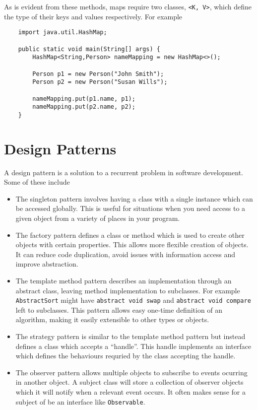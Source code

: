 \documentclass[12pt]{report}
\newcommand{\code}[1]{\lstinline{#1}}
\begin{document}
\begin{flushleft}
As is evident from these methods, maps require two classes, \code{<K, V>},
which define the type of their keys and values respectively. For example

\begin{lstlisting}
    import java.util.HashMap;

    public static void main(String[] args) {
        HashMap<String,Person> nameMapping = new HashMap<>();

        Person p1 = new Person("John Smith");
        Person p2 = new Person("Susan Wills");

        nameMapping.put(p1.name, p1);
        nameMapping.put(p2.name, p2);
    }
\end{lstlisting}

\section*{Design Patterns}

A design pattern is a solution to a recurrent problem in software development.
Some of these include

\begin{itemize}
    \item The singleton pattern involves having a class with a single instance
        which can be accessed globally. This is useful for situations when you
        need access to a given object from a variety of places in your program.
    \item The factory pattern defines a class or method which is used to create
        other objects with certain properties. This allows more flexible
        creation of objects. It can reduce code duplication, avoid issues with
        information access and improve abstraction.
    \item The template method pattern describes an implementation through an
        abstract class, leaving method implementation to subclasses. For
        example \code{AbstractSort} might have \code{abstract void swap} and
        \code{abstract void compare} left to subclasses. This pattern allows
        easy one-time definition of an algorithm, making it easily extensible
        to other types or objects.
    \item The strategy pattern is similar to the template method pattern but
        instead defines a class which accepts a ``handle''.  This handle
        implements an interface which defines the behaviours requried by the
        class accepting the handle.
    \item The observer pattern allows multiple objects to subscribe to events
        ocurring in another object. A subject class will store a collection of
        observer objects which it will notify when a relevant event occurs. It
        often makes sense for a subject of be an interface like
        \code{Observable}.
\end{itemize}


\end{flushleft}
\end{document}
